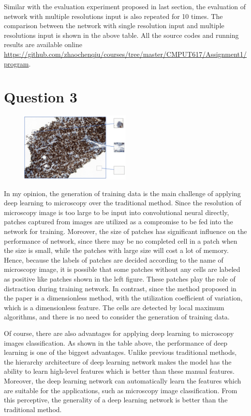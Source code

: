 \documentclass[UTF8]{article}
\begin{document}
Similar with the evaluation experiment proposed in last section,
the evaluation of network with multiple resolutions input is also repeated for 10 times.
%
The comparison between the network with single resolution input and multiple resolutions input is shown in the above table.
%
All the source codes and running results are available online \url{https://github.com/zhaochenqiu/courses/tree/master/CMPUT617/Assignment1/program}.

\newpage

\section*{Question 3}
\begin{figure}
  \includegraphics[width=0.5\textwidth]{../imgs/test.pdf}
    \label{fig1}
\end{figure}
In my opinion,
the generation of training data is the main challenge of applying deep learning to microscopy over the traditional method.
%
Since the resolution of microscopy image is too large to be input into convolutional neural directly,
patches captured from images are utilized as a compromise to be fed into the network for training.
%
Moreover, the size of patches has significant influence on the performance of network,
since there may be no completed cell in a patch when the size is small,
while the patches with large size will cost a lot of memory.
Hence, 
because the labels of patches are decided according to the name of microscopy image,
it is possible that some patches without any cells are labeled as positive like patches shown in the left figure.
%
These patches play the role of distraction during training network.
%
In contrast, since the method proposed in the paper \cite{bigras2018new} is a dimensionless method,
with the utilization coefficient of variation, which is a dimensionless feature.
%
The cells are detected by local maximum algorithms, 
and there is no need to consider the generation of training data.

Of course, there are also advantages for applying deep learning to microscopy images classification.
%
As shown in the table above, 
the performance of deep learning is one of the biggest advantages.
%
Unlike previous traditional methods,
the hierarchy architecture of deep learning network makes the model has the ability to learn 
high-level features which is better than these manual features.
%
Moreover,
the deep learning network can automatically learn the features which are suitable for the applications,
such as microscopy image classification.
%
From this perceptive,
the generality of a deep learning network is better than the traditional method.
\end{document}
